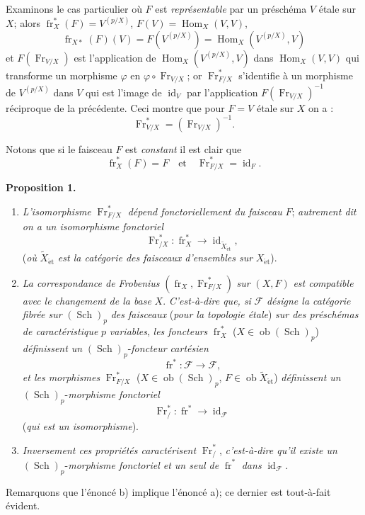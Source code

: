 \documentclass[11pt]{article}
\newenvironment{statement}[1]{\par\medskip\noindent\textbf{#1.}\ }{\par\medskip}
\DeclareMathOperator{\Hom}{Hom}
\providecommand{\et}{\mathrm{\acute{e}t}}
\providecommand{\id}{\operatorname{id}}
\providecommand{\Ob}{\operatorname{ob}}
\providecommand{\Hom}{\operatorname{Hom}}
\providecommand{\id}{\operatorname{id}}
\providecommand{\id}{\operatorname{id}}
\providecommand{\Ob}{\operatorname{ob}}
\providecommand{\id}{\operatorname{id}}
\providecommand{\id}{\operatorname{id}}
\providecommand{\Ob}{\operatorname{Ob}}
\providecommand{\Hom}{\operatorname{Hom}}
\providecommand{\Ob}{\operatorname{ob}}
\providecommand{\fr}{\operatorname{fr}}
\providecommand{\Fr}{\operatorname{Fr}}
\providecommand{\Sch}{\operatorname{Sch}}
\providecommand{\Fr}{\operatorname{Fr}}
\providecommand{\fr}{\operatorname{fr}}
\providecommand{\Sch}{\operatorname{Sch}}
\providecommand{\id}{\operatorname{id}}
\providecommand{\Ob}{\operatorname{Ob}}
\providecommand{\et}{\acute{e}t}
\begin{document}
Examinons le cas particulier où $F$ est \emph{représentable} par un préschéma $V$ étale sur $X$; alors $\fr_X^*(F)=V^{(p/X)}$, $F(V)=\Hom_X(V,V)$,
\[
\fr_{X*}(F)(V)=F(V^{(p/X)})=\Hom_X(V^{(p/X)},V)
\]
et $F(\Fr_{V/X})$ est l'application de $\Hom_X(V^{(p/X)},V)$ dans $\Hom_X(V,V)$ qui transforme un morphisme $\varphi$ en $\varphi\circ\Fr_{V/X}$; or $\Fr^*_{F/X}$ s'identifie à un morphisme de $V^{(p/X)}$ dans $V$ qui est l'image de $\id_V$ par l'application $F(\Fr_{V/X})^{-1}$ réciproque de la précédente. Ceci montre que pour $F=V$ étale sur $X$ on a :
\[
\Fr^*_{V/X}=(\Fr_{V/X})^{-1}.
\]

Notons que si le faisceau $F$ est \emph{constant} il est clair que
\[
\fr_X^*(F)=F
\quad\text{et}\quad
\Fr^*_{F/X}=\id_F.
\]

\begin{statement}{Proposition 1}
\begin{enumerate}[label=\alph*)]
\item \emph{L'isomorphisme} $\Fr^*_{F/X}$ \emph{dépend fonctoriellement du faisceau} $F$; \emph{autrement dit on a un isomorphisme fonctoriel}
\[
\Fr^*_{/X}:\fr_X^*\longrightarrow \id_{\widetilde X_{\et}},
\]
(\emph{où} $\widetilde X_{\et}$ \emph{est la catégorie des faisceaux d'ensembles sur} $X_{\et}$).
\item \emph{La correspondance de Frobenius} $(\fr_X,\Fr^*_{F/X})$ \emph{sur} $(X,F)$ \emph{est compatible avec le changement de la base} $X$. \emph{C'est-à-dire que, si} $\mathcal F$ \emph{désigne la catégorie fibrée sur} $(\Sch)_p$ \emph{des faisceaux} (\emph{pour la topologie étale}) \emph{sur des préschémas de caractéristique} $p$ \emph{variables}, \emph{les foncteurs} $\fr_X^*$ ($X\in\Ob(\Sch)_p$) \emph{définissent un} $(\Sch)_p$-\emph{foncteur cartésien}
\[
\fr^*: \mathcal F\longrightarrow\mathcal F,
\]
\emph{et les morphismes} $\Fr^*_{F/X}$ ($X\in\Ob(\Sch)_p$, $F\in\Ob\widetilde X_{\et}$) \emph{définissent un} $(\Sch)_p$-\emph{morphisme fonctoriel}
\[
\Fr^*_{/}:\fr^*\longrightarrow\id_{\mathcal F}
\]
(\emph{qui est un isomorphisme}).
\item \emph{Inversement ces propriétés caractérisent} $\Fr^*_{/}$, \emph{c'est-à-dire qu'il existe un} $(\Sch)_p$-\emph{morphisme fonctoriel et un seul de} $\fr^*$ \emph{dans} $\id_{\mathcal F}$.
\end{enumerate}
\end{statement}

Remarquons que l'énoncé b) implique l'énoncé a); ce dernier est tout-à-fait évident.
\end{document}

